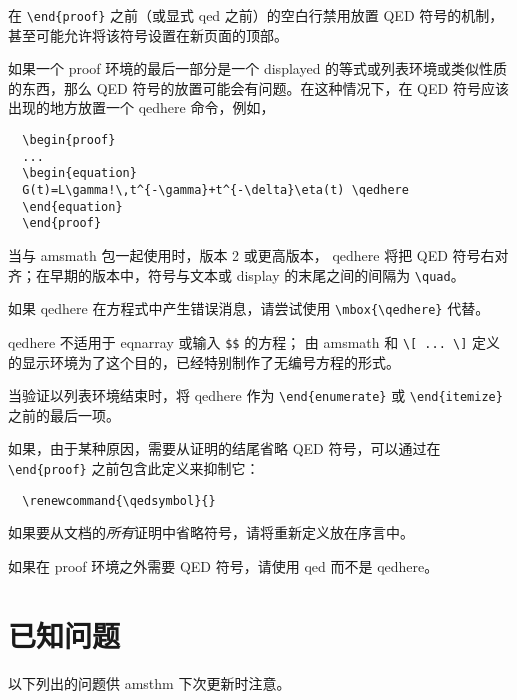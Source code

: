 \documentclass{article}
\newcommand{\ntt}{%
  \fontfamily\ttdefault \fontseries\mddefault \fontshape\updefault
  \selectfont
}
\DeclareRobustCommand{\cn}[1]{{\ntt\bslchar#1}}
\DeclareRobustCommand{\pkg}[1]{{\ntt#1}}
\DeclareRobustCommand{\env}[1]{{\ntt#1}}
\providecommand{\qedsymbol}{\leavevmode
  \hbox to.77778em{%
  \hfil\vrule
  \vbox to.675em{\hrule width.6em\vfil\hrule}%
  \vrule\hfil}}
\begin{document}
在 \verb+\end{proof}+ 之前（或显式 \cn{qed} 之前）的空白行禁用放置 QED 符号的机制，甚至可能允许将该符号设置在新页面的顶部。

如果一个 \env{proof} 环境的最后一部分是一个 displayed 的等式或列表环境或类似性质的东西，那么 QED 符号的放置可能会有问题。在这种情况下，在 QED 符号应该出现的地方放置一个 \cn{qedhere} 命令，例如，
\begin{verbatim}
  \begin{proof}
  ...
  \begin{equation}
  G(t)=L\gamma!\,t^{-\gamma}+t^{-\delta}\eta(t) \qedhere
  \end{equation}
  \end{proof}
\end{verbatim}
当与 \pkg{amsmath} 包一起使用时，版本 2 或更高版本，\cn{qedhere} 将把 QED 符号右对齐；在早期的版本中，符号与文本或 display 的末尾之间的间隔为 \verb+\quad+。

如果 \cn{qedhere} 在方程式中产生错误消息，请尝试使用 \verb+\mbox{\qedhere}+ 代替。

\cn{qedhere} 不适用于 \env{eqnarray} 或输入 \verb+$$+ 的方程；
由 \pkg{amsmath} 和 \verb+\[ ... \]+ 定义的显示环境为了这个目的，已经特别制作了无编号方程的形式。

当验证以列表环境结束时，将 \cn{qedhere} 作为 \verb+\end{enumerate}+ 或 \verb+\end{itemize}+ 之前的最后一项。

如果，由于某种原因，需要从证明的结尾省略 QED 符号，可以通过在 \verb+\end{proof}+ 之前包含此定义来抑制它：
\begin{verbatim}
  \renewcommand{\qedsymbol}{}
\end{verbatim}
如果要从文档的\emph{所有}证明中省略符号，请将重新定义放在序言中。

如果在 \env{proof} 环境之外需要 QED 符号，请使用 \cn{qed} 而不是 \cn{qedhere}。



\section{已知问题}

以下列出的问题供 \pkg{amsthm} 下次更新时注意。
\end{document}
